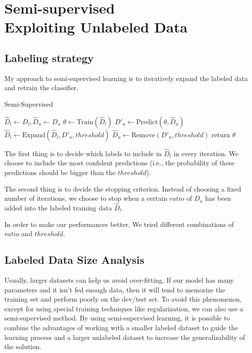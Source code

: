 \section{\textbf{Semi-supervised\\ Exploiting Unlabeled Data}}

\subsection{\textbf{Labeling strategy}}

My approach to semi-supervised learning is to iteratively expand the labeled data and retrain the classifier.

\begin{algorithm}[]
  \caption{Semi-Supervised}
  $\hat{D}_l \leftarrow D_l, \hat{D}_u \leftarrow D_u$\;
  {
    $\theta \leftarrow \text{Train}(\hat{D}_l)$\;
    $D'_u \leftarrow \text{Predict}(\theta, \hat{D}_u)$\;
    $\hat{D}_l \leftarrow \text{Expand}(\hat{D}_l, D'_u, threshold)$\;
    $\hat{D}_u \leftarrow \text{Remove}(D'_u, threshold)$\;
  }
  return $\theta$\;
\end{algorithm}

The first thing is to decide which labels to include in $\hat{D}_l$ in every iteration. We choose to include the most confident predictions (i.e., the probability of these predictions should be bigger than the $threshold$).

The second thing is to decide the stopping criterion. Instead of choosing a fixed number of iterations, we choose to stop when a certain $ratio$ of $D_u$ has been added into the labeled training data $\hat{D}_l$.

In order to make our performances better, We tried different combinations of $ratio$ and $threshold$.

\subsection{\textbf{Labeled Data Size Analysis}}

Usually, larger datasets can help us avoid over-fitting. If our model has many parameters and it isn't fed enough data, then it will tend to memorize the training set and perform poorly on the dev/test set. To avoid this phenomenon, except for using special training techniques like regularization, we can also use a semi-supervised method. By using semi-supervised learning, it is possible to combine the advantages of working with a smaller labeled dataset to guide the learning process and a larger unlabeled dataset to increase the generalizability of the solution. 

